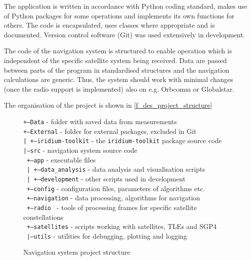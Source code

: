 The application is written in accordance with Python coding standard, makes use of Python packages for some operations and implements its own functions for others. The code is encapsulated, uses classes where appropriate and is documented. Version control software (Git) was used extensively in development.

The code of the navigation system is structured to enable operation which is independent of the specific satellite system being received. Data are passed between parts of the program in standardised structures and the navigation calculations are generic. Thus, the system should work with minimal changes (once the radio support is implemented) also on e.g. Orbcomm or Globalstar.

The organisation of the project is shown in \autoref{f_des_project_structure}

\begin{figure}
    \begin{framed}
        \raggedright
        \texttt{+---Data} - folder with saved data from measurements \\    
        \texttt{+---External} - folder for external packages, excluded in Git\\
        \texttt{|   +---iridium-toolkit} - the \texttt{iridium-toolkit} package source code\\
        \texttt{|---src} - navigation system source code\\
        \texttt{    +---app} - executable files\\
        \texttt{    |   +---data\_analysis} - data analysis and visualisation scripts\\
        \texttt{    |   +---development} - other scripts used in development\\
        \texttt{    +---config} - configuration files, parameters of algorithms etc.\\
        \texttt{    +---navigation} - data processing, algorithms for navigation\\
        \texttt{    +---radio   } - tools of processing frames for specific satellite constellations\\  
        \texttt{    +---satellites} - scripts working with satellites, TLEs and SGP4\\
        \texttt{    |---utils} - utilities for debugging, plotting and logging\\
    \end{framed}
    \caption{Navigation system project structure}
    \label{f_des_project_structure}
\end{figure}

